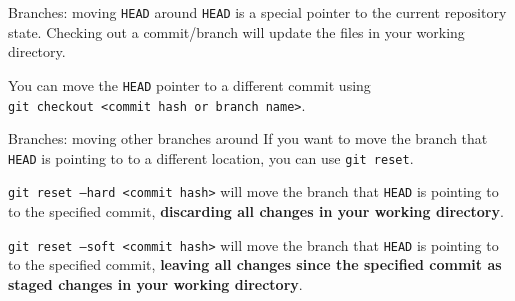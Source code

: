 \documentclass{beeper}
\begin{document}
\begin{frame}{Branches: moving \texttt{HEAD} around}
    \texttt{HEAD} is a special pointer to the current repository state.
    Checking out a commit/branch will update the files in your working
    directory.

    You can move the \texttt{HEAD} pointer to a different commit using\\
    \texttt{git checkout <commit hash or branch name>}.

\end{frame}

\begin{frame}{Branches: moving other branches around}
    If you want to move the branch that \texttt{HEAD} is pointing to to a
    different location, you can use \texttt{git reset}.
    \pause

    \texttt{git reset --hard <commit hash>} will move the branch that \texttt{HEAD}
    is pointing to to the specified commit, \textbf{discarding all changes in
    your working directory}.
    \pause

    \texttt{git reset --soft <commit hash>} will move the branch that
    \texttt{HEAD} is pointing to to the specified commit, \textbf{leaving all
    changes since the specified commit as staged changes in your working
    directory}.
\end{frame}
\end{document}
